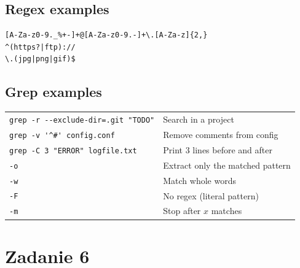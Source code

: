 \documentclass[11pt]{article}
\begin{document}
\subsection*{Regex examples}

\begin{verbatim}
[A-Za-z0-9._%+-]+@[A-Za-z0-9.-]+\.[A-Za-z]{2,}
^(https?|ftp)://
\.(jpg|png|gif)$
\end{verbatim}

\subsection*{Grep examples}
\begin{tabular}{ll}
\verb|grep -r --exclude-dir=.git "TODO"| & Search in a project \\
\verb|grep -v '^#' config.conf| & Remove comments from config \\
\verb|grep -C 3 "ERROR" logfile.txt| & Print 3 lines before and after \\
\verb|-o| & Extract only the matched pattern\\
\verb|-w| & Match whole words\\
\verb|-F| & No regex (literal pattern)\\
\verb|-m| & Stop after $x$ matches
\end{tabular}

\section*{Zadanie 6}
\end{document}
